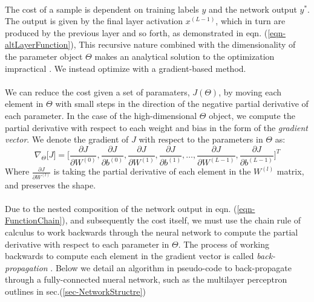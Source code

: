 \documentclass[12pt,letterpaper]{article}
\begin{document}
\paragraph*{}The cost of a sample is dependent on training labels $y$ and the network output $y^*$. The output is given by the final layer activation $x^{(L-1)}$, which in turn are produced by the previous layer and so forth, as demonstrated in eqn. (\ref{eqn-altLayerFunction}), This recursive nature combined with the dimensionality of the parameter object $\Theta$ makes an analytical solution to the optimization impractical \cite{Geron,Goodfellow,James}. We instead optimize with a gradient-based method. 

\paragraph*{}We can reduce the cost given a set of paramaters, $J(\Theta)$, by moving each element in $\Theta$ with small steps in the direction of the negative partial derivative of each parameter. In the case of the high-dimensional $\Theta$ object, we compute the partial derivative with respect to each weight and bias in the form of the \textit{gradient vector}. We denote the gradient of $J$ with respect to the parameters in $\Theta$ as:
\begin{equation}
\label{eqn-CostGradient}
\nabla_{\Theta}\big[ J \big] = 
\Big[ 	\frac{\partial J}{\partial W^{(0)}}, \frac{\partial J}{\partial b^{(0)}}, 
		\frac{\partial J}{\partial W^{(1)}}, \frac{\partial J}{\partial b^{(1)}}, \hdots ,
		\frac{\partial J}{\partial W^{(L-1)}}, \frac{\partial J}{\partial b^{(L-1)}} \Big]^T
\end{equation}
Where $\frac{\partial J}{\partial W^{(l)}}$ is taking the partial derivative of each element in the $W^{(l)}$ matrix, and preserves the shape.

\paragraph*{}Due to the nested composition of the network output in eqn. (\ref{eqn-FunctionChain}), and subsequently the cost itself, we must use the chain rule of calculus to work backwards through the neural network to compute the partial derivative with respect to each parameter in $\Theta$. The process of working backwards to compute each element in the gradient vector is called \textit{back-propagation} \cite{Geron}. Below we detail an algorithm in pseudo-code to back-propagate through a fully-connected nueral network, such as the multilayer perceptron outlines in sec.(\ref{sec-NetworkStructre})
\end{document}
